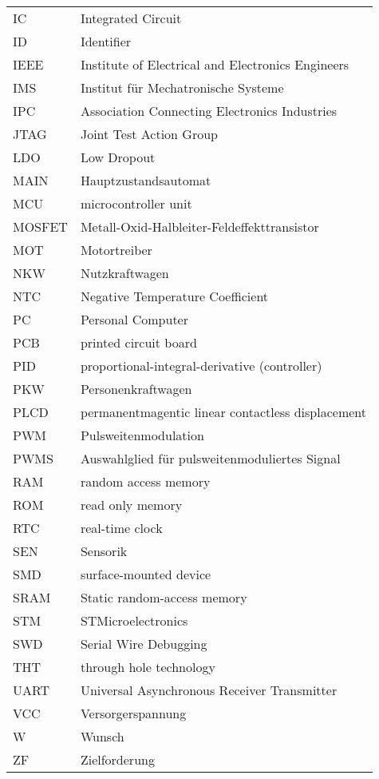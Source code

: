 \begin{table}[H]
\begin{tabular}{p{2cm}p{15cm}}
			IC\dotfill & Integrated Circuit\\
			ID\dotfill & Identifier\\
			IEEE\dotfill & Institute of Electrical and Electronics Engineers\\
			IMS\dotfill & Institut für Mechatronische Systeme\\
			IPC\dotfill & Association Connecting Electronics Industries\\
			JTAG\dotfill & Joint Test Action Group\\
			LDO\dotfill & Low Dropout\\
			MAIN\dotfill & Hauptzustandsautomat\\
			MCU\dotfill & microcontroller unit\\
			MOSFET\dotfill & Metall-Oxid-Halbleiter-Feldeffekttransistor\\
			MOT\dotfill & Motortreiber\\
			NKW\dotfill & Nutzkraftwagen\\
			NTC\dotfill & Negative Temperature Coefficient\\
			PC\dotfill & Personal Computer\\
			PCB\dotfill & printed circuit board\\
			PID\dotfill & proportional-integral-derivative (controller)\\
			PKW\dotfill & Personenkraftwagen\\
			PLCD\dotfill & permanentmagentic linear contactless displacement\\
			PWM\dotfill &  Pulsweitenmodulation\\
			PWMS\dotfill & Auswahlglied für pulsweitenmoduliertes Signal\\
			RAM\dotfill & random access memory\\
			ROM\dotfill & read only memory\\
			RTC\dotfill & real-time clock\\
			SEN\dotfill & Sensorik\\
			SMD\dotfill & surface-mounted device\\
			SRAM\dotfill & Static random-access memory\\
			STM\dotfill & STMicroelectronics\\
			SWD\dotfill & Serial Wire Debugging\\
			THT\dotfill & through hole technology\\
			UART\dotfill & Universal Asynchronous Receiver Transmitter\\
			VCC\dotfill & Versorgerspannung\\
			W\dotfill & Wunsch \\
			ZF\dotfill & Zielforderung\\
		\end{tabular}
		\label{Abkuerzung}
\end{table}


